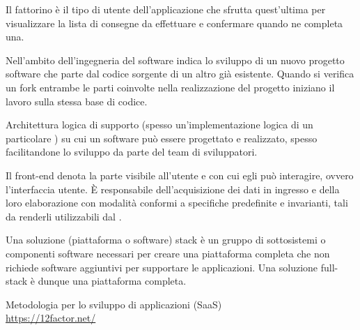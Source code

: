 Il fattorino è il tipo di utente dell’applicazione che sfrutta quest’ultima per visualizzare la lista di consegne da effettuare e confermare quando ne completa una.

Nell'ambito dell'ingegneria del software indica lo sviluppo di un nuovo progetto software che parte dal codice sorgente di un altro già esistente. Quando si verifica un fork entrambe le parti coinvolte nella realizzazione del progetto iniziano il lavoro sulla stessa base di codice.

Architettura logica di supporto (spesso un'implementazione logica di un particolare ) su cui un software può essere progettato e realizzato, spesso facilitandone lo sviluppo da parte del team di sviluppatori.

Il front-end denota la parte visibile all’utente e con cui egli può interagire, ovvero l’interfaccia utente. \`{E} responsabile dell’acquisizione dei dati in ingresso e della loro elaborazione con modalità conformi a specifiche predefinite e invarianti, tali da renderli utilizzabili dal .

Una soluzione (piattaforma o software) stack è un gruppo di sottosistemi o componenti software necessari per creare una piattaforma completa che non richiede software aggiuntivi per supportare le applicazioni. Una soluzione full-stack è dunque una piattaforma completa.	

Metodologia per lo sviluppo di applicazioni  (SaaS)\\
\url{https://12factor.net/}
\clearpage
